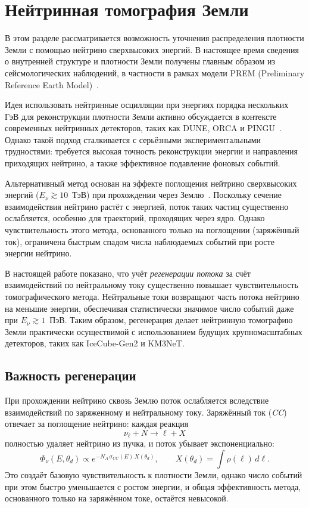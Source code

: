 \section{Нейтринная томография Земли}
\label{sec:tomography}
В этом разделе рассматривается возможность уточнения распределения плотности Земли с помощью нейтрино сверхвысоких энергий.  
В настоящее время сведения о внутренней структуре и плотности Земли получены главным образом из сейсмологических наблюдений, в частности в рамках модели PREM (Preliminary Reference Earth Model)~\cite{dziewonskiPREM1981}.

Идея использовать нейтринные осцилляции при энергиях порядка нескольких ГэВ для реконструкции плотности Земли активно обсуждается в контексте современных нейтринных детекторов, таких как DUNE, ORCA и PINGU~\cite{winterTomography2013,akhmedovTomography2006}.  
Однако такой подход сталкивается с серьёзными экспериментальными трудностями: требуется высокая точность реконструкции энергии и направления приходящих нейтрино, а также эффективное подавление фоновых событий.

Альтернативный метод основан на эффекте поглощения нейтрино сверхвысоких энергий ($E_\nu \gtrsim 10$~ТэВ) при прохождении через Землю~\cite{gandhiAbsorption1998,franceTomography2019}.  
Поскольку сечение взаимодействия нейтрино растёт с энергией, поток таких частиц существенно ослабляется, особенно для траекторий, проходящих через ядро.  
Однако чувствительность этого метода, основанного только на поглощении (заряжённый ток), ограничена быстрым спадом числа наблюдаемых событий при росте энергии нейтрино.

В настоящей работе показано, что учёт \emph{регенерации потока} за счёт взаимодействий по нейтральному току существенно повышает чувствительность томографического метода.  
Нейтральные токи возвращают часть потока нейтрино на меньшие энергии, обеспечивая статистически значимое число событий даже при $E_\nu \gtrsim 1$~ПэВ.  
Таким образом, регенерация делает нейтринную томографию Земли практически осуществимой с использованием будущих крупномасштабных детекторов, таких как IceCube-Gen2 и KM3NeT.

\subsection{Важность регенерации}

При прохождении нейтрино сквозь Землю поток ослабляется вследствие взаимодействий по заряженному и нейтральному току.  
Заряжённый ток (\textit{CC}) отвечает за поглощение нейтрино: каждая реакция
\[
\nu_\ell + N \to \ell + X
\]
полностью удаляет нейтрино из пучка, и поток убывает экспоненциально:
\[
\Phi_\nu(E,\theta_d) \propto 
e^{-N_A\,\sigma_{CC}(E)\,X(\theta_d)}, 
\qquad
X(\theta_d) = \int \rho(\ell)\, d\ell .
\]
Это создаёт базовую чувствительность к плотности Земли, однако число событий при этом быстро уменьшается с ростом энергии, и общая эффективность метода, основанного только на заряжённом токе, остаётся невысокой.

